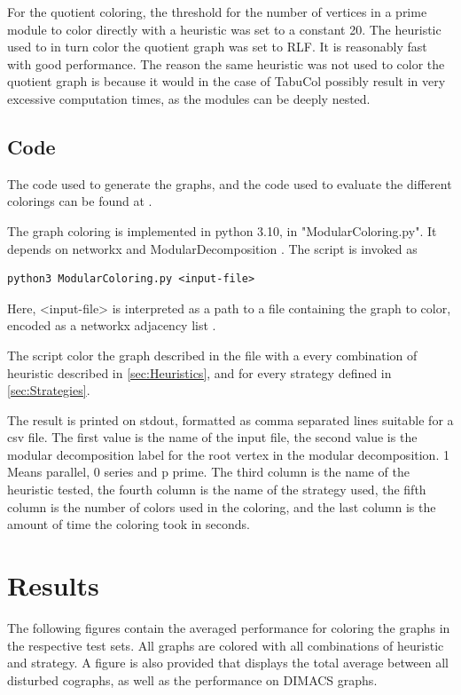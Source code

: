 \documentclass[a4paper]{article}
\begin{document}
For the quotient coloring, the threshold for the number of vertices in a prime
module to color directly with a heuristic was set to a constant 20. The
heuristic used to in turn color the quotient graph was set to RLF. It is
reasonably fast with good performance. The reason the same heuristic was not
used to color the quotient graph is because it would in the case of TabuCol
possibly result in very excessive computation times, as the modules can be
deeply nested.


\subsection{Code}

The code used to generate the graphs, and the code used to evaluate the
different colorings can be found at
\cite{BCGithub}.

The graph coloring is implemented in python 3.10, in "ModularColoring.py". 
It depends on networkx \cite{Networkx} and ModularDecomposition \cite{Anna}.
The script is invoked as 
\begin{verbatim}
python3 ModularColoring.py <input-file> 
\end{verbatim}

Here, <input-file> is interpreted as a path to a file containing the graph to color,
encoded as a networkx adjacency list \cite{NetworkXFormat}.

The script color the graph described in the file with a every combination of 
heuristic described in \autoref{sec:Heuristics}, and for every strategy 
defined in \autoref{sec:Strategies}.

The result is printed on stdout, formatted as comma separated lines suitable for
a csv file. The first value is the name of the input file, the second value is
the modular decomposition label for the root vertex in the modular
decomposition. 1 Means parallel, 0 series and p prime.  The third column is the
name of the heuristic tested, the fourth column is the name of the strategy
used, the fifth column is the number of colors used in the coloring, and the
last column is the amount of time the coloring took in seconds. 

\section{Results}
\label{sec:Result}

The following figures contain the averaged performance for coloring the graphs in the
respective test sets. All graphs are colored with all combinations of heuristic
and strategy. A figure is also provided that displays the total average between
all disturbed cographs, as well as the performance on DIMACS graphs. 
\end{document}
